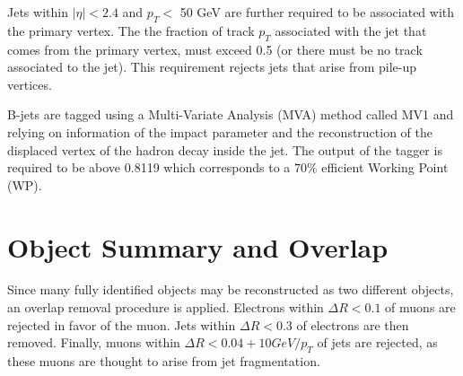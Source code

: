 Jets within $|\eta| < 2.4$ and $p_T <$ 50 GeV are further required to be
associated with the primary vertex. The the fraction of track $p_T$ associated with the jet that comes from the primary vertex,
must exceed 0.5 (or there must be no track associated to the jet). This requirement rejects jets that arise from pile-up 
vertices.

B-jets are tagged using a Multi-Variate Analysis (MVA) method called MV1 and relying on information
of the impact parameter and the reconstruction of the displaced vertex of the
hadron decay inside the jet\cite{ATLAS-CONF-2011-102}.
The output of the tagger is required to be above 0.8119 which corresponds to a $70\%$ efficient Working Point (WP).

\section{Object Summary and Overlap}

Since many fully identified objects may be reconstructed as two different objects, an overlap removal procedure is applied.
Electrons within $\Delta R < 0.1$ of muons are rejected in favor of the muon. Jets within $\Delta R < 0.3$ of electrons are 
then removed. Finally, muons within $\Delta R < 0.04 + 10 GeV/p_{T}$ of jets are rejected, as these muons are thought to
arise from jet fragmentation. 


